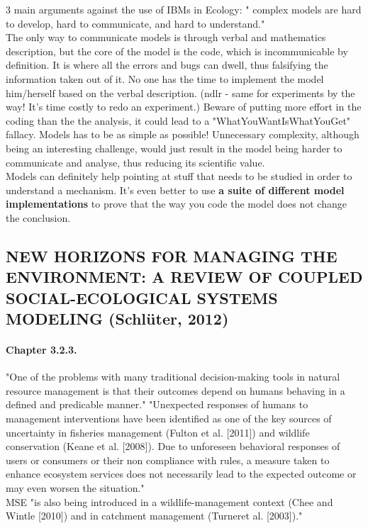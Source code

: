 \documentclass[12pt]{article}
\begin{document}
3 main arguments against the use of IBMs in Ecology: " complex  models  are  hard  to develop,   hard to   communicate,   and   hard   to understand."\\
The only way to communicate models is through verbal and mathematics description, but the core of the model is the code, which is incommunicable by definition. It is where all the errors and bugs can dwell, thus falsifying the information taken out of it. No one has the time to implement the model him/herself based on the verbal description. (ndlr - same for experiments by the way! It's time costly to redo an experiment.) Beware of putting more effort in the coding than the the analysis, it could lead to a "WhatYouWantIsWhatYouGet" fallacy. Models has to be as simple as possible! Unnecessary complexity, although being an interesting challenge, would just result in the model being harder to communicate and analyse, thus reducing its scientific value.\\
Models can definitely help pointing at stuff that needs to be studied in order to understand a mechanism. It's even better to use \textbf{a suite of different model implementations} to prove that the way you code the model does not change the conclusion.

\subsection{NEW HORIZONS FOR MANAGING THE ENVIRONMENT: A REVIEW OF COUPLED SOCIAL-ECOLOGICAL SYSTEMS MODELING (Schlüter, 2012)}

\paragraph{Chapter 3.2.3.} "One of the problems with many traditional decision-making tools in natural resource management is that their outcomes depend on humans behaving in a defined and predicable manner."
"Unexpected responses of humans to management interventions have been identified as one of the key sources of uncertainty in fisheries management (Fulton et al. [2011]) and wildlife conservation (Keane et al. [2008]). Due to unforeseen behavioral responses of users or consumers or their non  compliance with rules, a measure taken to enhance ecosystem services does not necessarily lead to the expected outcome or may even worsen the situation."\\
MSE "is also being introduced in a wildlife-management context (Chee and Wintle [2010]) and in catchment management (Turneret al. [2003])."
\end{document}
